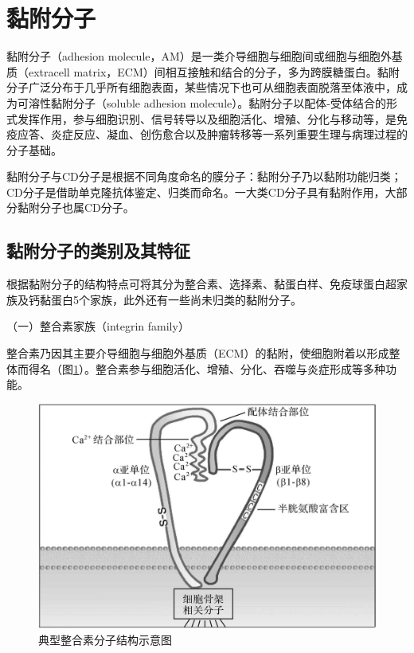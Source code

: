 \section{黏附分子}

黏附分子（adhesion
molecule，AM）是一类介导细胞与细胞间或细胞与细胞外基质（extracell
matrix，ECM）间相互接触和结合的分子，多为跨膜糖蛋白。黏附分子广泛分布于几乎所有细胞表面，某些情况下也可从细胞表面脱落至体液中，成为可溶性黏附分子（soluble
adhesion
molecule）。黏附分子以配体-受体结合的形式发挥作用，参与细胞识别、信号转导以及细胞活化、增殖、分化与移动等，是免疫应答、炎症反应、凝血、创伤愈合以及肿瘤转移等一系列重要生理与病理过程的分子基础。

黏附分子与CD分子是根据不同角度命名的膜分子：黏附分子乃以黏附功能归类；CD分子是借助单克隆抗体鉴定、归类而命名。一大类CD分子具有黏附作用，大部分黏附分子也属CD分子。


\subsection{黏附分子的类别及其特征}

根据黏附分子的结构特点可将其分为整合素、选择素、黏蛋白样、免疫球蛋白超家族及钙黏蛋白5个家族，此外还有一些尚未归类的黏附分子。

（一）整合素家族（integrin family）

整合素乃因其主要介导细胞与细胞外基质（ECM）的黏附，使细胞附着以形成整体而得名（图\ref{fig8-7}）。整合素参与细胞活化、增殖、分化、吞噬与炎症形成等多种功能。

\begin{figure}[!htbp]
 \centering
 \includegraphics{./images/Image00117.jpg}
 \captionsetup{justification=centering}
 \caption{典型整合素分子结构示意图}
 \label{fig8-7}
  \end{figure} 

